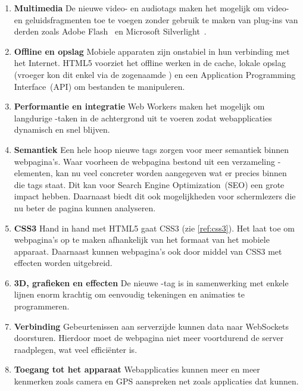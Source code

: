 \begin{enumerate}
\item \textbf{Multimedia} 
De nieuwe video- en audiotags maken het mogelijk om video- en geluidsfragmenten toe te voegen zonder gebruik te maken van plug-ins van derden zoals Adobe Flash~\cite{Adobe2013} en Microsoft Silverlight~\cite{Microsoft2013}.

\item \textbf{Offline en opslag}  
Mobiele apparaten zijn onstabiel in hun verbinding met het Internet. HTML5 voorziet het offline werken in de cache, lokale opslag (vroeger kon dit enkel via de zogenaamde ) en een Application Programming Interface~(API) om bestanden te manipuleren.

\item \textbf{Performantie en integratie}
Web Workers maken het mogelijk om langdurige \js{}-taken in de achtergrond uit te voeren zodat webapplicaties dynamisch en snel blijven.

\item \textbf{Semantiek}
Een hele hoop nieuwe tags zorgen voor meer semantiek binnen webpagina's. 
Waar voorheen de webpagina bestond uit een verzameling -elementen, kan nu veel concreter worden aangegeven wat er precies binnen die tags staat. 
Dit kan voor Search Engine Optimization~(SEO) een grote impact hebben. 
Daarnaast biedt dit ook mogelijkheden voor schermlezers die nu beter de pagina kunnen analyseren.

\item \textbf{CSS3}
Hand in hand met HTML5 gaat CSS3 (zie \ref{ref:css3}). 
Het laat toe om webpagina's op te maken afhankelijk van het formaat van het mobiele apparaat. 
Daarnaast kunnen webpagina's ook door middel van CSS3 met effecten worden uitgebreid. 

\item \textbf{3D, grafieken en effecten}
De nieuwe -tag is in samenwerking met enkele lijnen \js{} enorm krachtig om eenvoudig tekeningen en animaties te programmeren.

\item \textbf{Verbinding}
Gebeurtenissen aan serverzijde kunnen data naar WebSockets doorsturen. 
Hierdoor moet de webpagina niet meer voortdurend de server raadplegen, wat veel efficiënter is.

\item \textbf{Toegang tot het apparaat}
Webapplicaties kunnen meer en meer kenmerken zoals camera en GPS aanspreken net zoals  applicaties dat kunnen. 
\end{enumerate}

